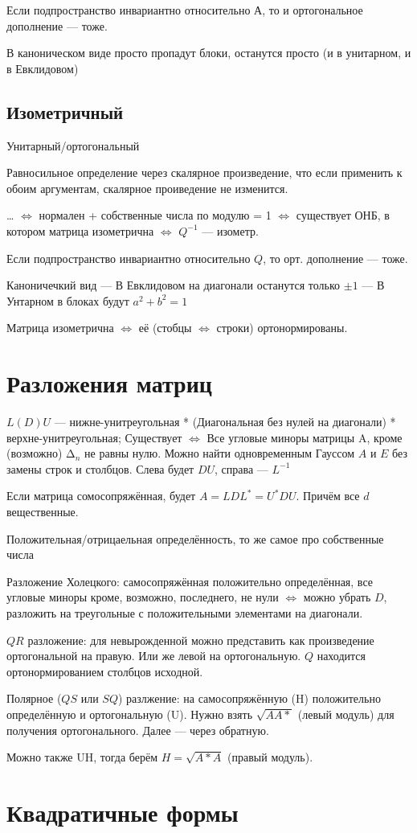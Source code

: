 \documentclass[12pt, a4paper]{article}
\begin{document}
Если подпространство инвариантно относительно А, то и ортогональное дополнение — тоже.

В каноническом виде просто пропадут блоки, останутся просто (и в унитарном, и в Евклидовом)


\subsection{Изометричный}

Унитарный/ортогональный

Равносильное определение через скалярное произведение, что если применить к обоим аргументам, скалярное проиведение не изменится.



…
$\Longleftrightarrow$ нормален + собственные числа по модулю = 1
$\Longleftrightarrow$ существует ОНБ, в котором матрица изометрична
$\Longleftrightarrow$ $Q^{-1}$ — изометр.

Если подпространство инвариантно относительно $Q$, то орт. дополнение — тоже.

Каноничечкий вид
— В Евклидовом на диагонали останутся только $± 1$
— В Унтарном в блоках будут $a^2 + b^2 = 1$

Матрица изометрична $\Longleftrightarrow$ её (стобцы $\Longleftrightarrow$ строки) ортонормированы.


\section{Разложения матриц}

$L(D)U$ — нижне-унитреугольная * (Диагональная без нулей на диагонали) * верхне-унитреугольная; 
Существует $\Longleftrightarrow$ Все угловые миноры матрицы A, кроме (возможно) $∆_n$ не равны нулю. 
Можно найти одновременным Гауссом $A$ и $E$ без замены строк и столбцов. Слева будет $DU$, справа — $L^{-1}$

Если матрица сомосопряжённая, будет $A = LDL^* = U^*DU$. Причём все $d$ вещественные.

Положительная/отрицаельная определённость, то же самое про собственные числа

Разложение Холецкого: самосопряжённая положительно определённая, все угловые миноры кроме, возможно, последнего, не нули $\Longleftrightarrow$ можно убрать $D$, 
разложить на треугольные с положительными элементами на диагонали.

$QR$ разложение: для невырожденной можно представить как произведение ортогональной на правую. Или же левой на ортогональную.
$Q$ находится ортонормированием столбцов исходной.

Полярное ($QS$ или $SQ$) разлжение: на самосопряжённую (H) положительно определённую и ортогональную (U). 
Нужно взять $\sqrt{AA*}$ (левый модуль) для получения ортогонального. Далее — через обратную.

Можно также UH, тогда берём $H = \sqrt{A*A}$ (правый модуль).



\section{Квадратичные формы}
\end{document}
